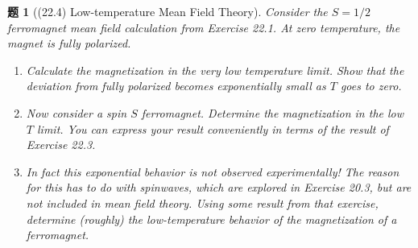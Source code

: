 \documentclass[UTF8,10pt,a4paper]{article}
\theoremstyle{Problem}
\newtheorem{prob}{题}
\theoremstyle{Solution}
\begin{document}
\begin{prob}[(22.4) Low-temperature Mean Field Theory]
    Consider the $S=1/2$ ferromagnet mean field calculation from Exercise 22.1. At zero temperature, the magnet is fully polarized.
    \begin{enumerate}
        \item[(a)] Calculate the magnetization in the very low temperature limit. Show that the deviation from fully polarized becomes exponentially small as $T$ goes to zero.
        \item[(b)$^*$] Now consider a spin $S$ ferromagnet. Determine the magnetization in the low $T$ limit. You can express your result conveniently in terms of the result of Exercise 22.3.
        \item[(c)$^*$] In fact this exponential behavior is not observed experimentally! The reason for this has to do with spinwaves, which are explored in Exercise 20.3, but are not included in mean field theory. Using some result from that exercise, determine (roughly) the low-temperature behavior of the magnetization of a ferromagnet.
    \end{enumerate}
\end{prob}
\end{document}
